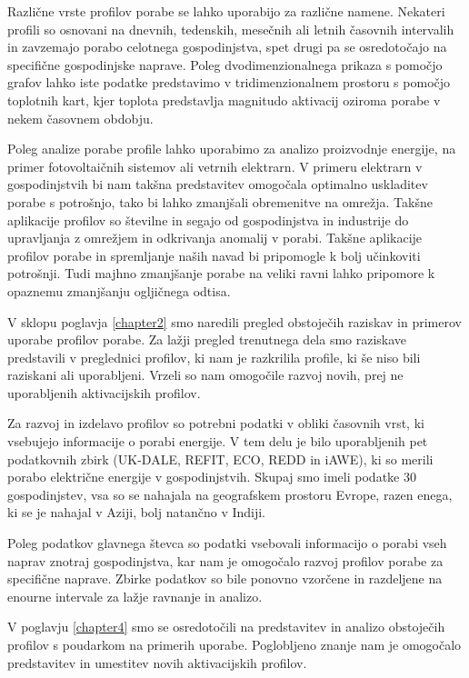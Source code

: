\begin{sloabstract}
Različne vrste profilov porabe se lahko uporabijo za različne namene. Nekateri profili so osnovani na dnevnih, tedenskih, mesečnih ali letnih časovnih intervalih in zavzemajo porabo celotnega gospodinjstva, spet drugi pa se osredotočajo na specifične gospodinjske naprave. Poleg dvodimenzionalnega prikaza s pomočjo grafov lahko iste podatke predstavimo v tridimenzionalnem prostoru s pomočjo toplotnih kart, kjer toplota predstavlja magnitudo aktivacij oziroma porabe v nekem časovnem obdobju.  

Poleg analize porabe profile lahko uporabimo za analizo proizvodnje energije, na primer fotovoltaičnih sistemov ali vetrnih elektrarn. V primeru elektrarn v gospodinjstvih bi nam takšna predstavitev omogočala optimalno uskladitev porabe s potrošnjo, tako bi lahko zmanjšali obremenitve na omrežja. Takšne aplikacije profilov so številne in segajo od gospodinjstva in industrije do upravljanja z omrežjem in odkrivanja anomalij v porabi. Takšne aplikacije profilov porabe in spremljanje naših navad bi pripomogle k bolj učinkoviti potrošnji. Tudi majhno zmanjšanje porabe na veliki ravni lahko pripomore k opaznemu zmanjšanju ogljičnega odtisa. 

V sklopu poglavja \ref{chapter2} smo naredili pregled obstoječih raziskav in primerov uporabe profilov porabe. Za lažji pregled trenutnega dela smo raziskave predstavili v preglednici profilov, ki nam je razkrilila profile, ki še niso bili raziskani ali uporabljeni. Vrzeli so nam omogočile razvoj novih, prej ne uporabljenih aktivacijskih profilov.  

Za razvoj in izdelavo profilov so potrebni podatki v obliki časovnih vrst, ki vsebujejo informacije o porabi energije. V tem delu je bilo uporabljenih pet podatkovnih zbirk (UK-DALE, REFIT, ECO, REDD in iAWE), ki so merili porabo električne energije v gospodinjstvih. Skupaj smo imeli podatke 30 gospodinjstev, vsa so se nahajala na geografskem prostoru Evrope, razen enega, ki se je nahajal v Aziji, bolj natančno v Indiji.  

Poleg podatkov glavnega števca so podatki vsebovali informacijo o porabi vseh naprav znotraj gospodinjstva, kar nam je omogočalo razvoj profilov porabe za specifične naprave. Zbirke podatkov so bile ponovno vzorčene in razdeljene na enourne intervale za lažje ravnanje in analizo.  

V poglavju \ref{chapter4} smo se osredotočili na predstavitev in analizo obstoječih profilov s poudarkom na primerih uporabe. Poglobljeno znanje nam je omogočalo predstavitev in umestitev novih aktivacijskih profilov.  


\end{sloabstract}
